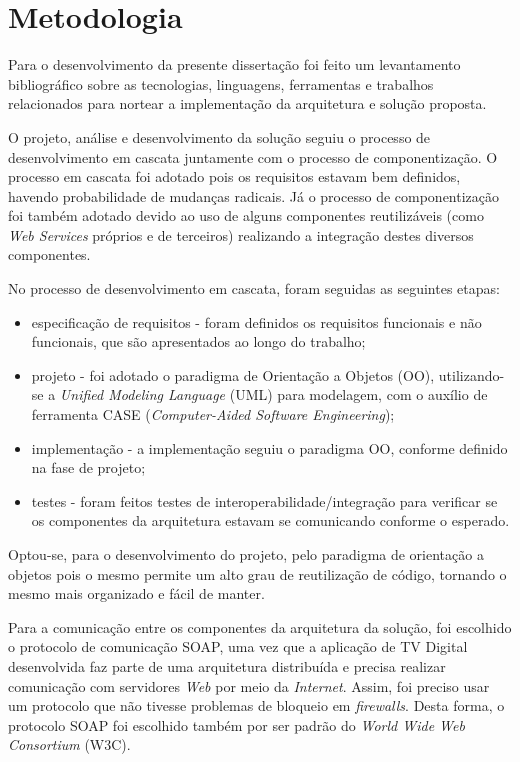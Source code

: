 \section{Metodologia} \label{sec:metodologia}

Para o desenvolvimento da presente dissertação foi feito um levantamento bibliográfico
sobre as tecnologias, linguagens, ferramentas e trabalhos relacionados para nortear
a implementação da arquitetura e solução proposta.

O projeto, análise e desenvolvimento da solução seguiu o
processo de desenvolvimento em cascata juntamente com o processo de componentização\cite{sommerville2011soft}.
O processo em cascata foi adotado pois os requisitos estavam bem definidos, havendo  probabilidade de mudanças radicais.
Já o processo de componentização foi também adotado devido ao uso de alguns componentes reutilizáveis
(como \textit{Web Services} próprios e de terceiros) realizando a integração destes diversos
componentes.

No processo de desenvolvimento em cascata, foram seguidas as seguintes etapas:
\begin{itemize}
	\item especificação de requisitos - foram definidos os requisitos funcionais e não funcionais, que são apresentados ao longo do trabalho;
	\item projeto - foi adotado o paradigma de Orientação a Objetos (OO), utilizando-se a \textit{Unified Modeling Language} (UML) para modelagem, com o auxílio de ferramenta CASE (\textit{Computer-Aided Software Engineering});
	\item implementação - a implementação seguiu o paradigma OO, conforme definido na fase de projeto;
	\item testes - foram feitos testes de interoperabilidade/integração para verificar se os componentes
	da arquitetura estavam se comunicando conforme o esperado.
\end{itemize}


Optou-se, para o desenvolvimento do projeto, pelo paradigma de orientação a objetos pois o mesmo 
permite um alto grau de reutilização de código, tornando o mesmo mais organizado
e fácil de manter.

Para a comunicação entre os componentes da arquitetura da solução, foi escolhido o protocolo de comunicação SOAP, uma vez que a aplicação de TV Digital desenvolvida
faz parte de uma arquitetura distribuída e precisa realizar comunicação 
com servidores \textit{Web} por meio da \textit{Internet}. Assim, foi preciso usar um protocolo
que não tivesse problemas de bloqueio em \textit{firewalls}. Desta forma, o protocolo SOAP foi escolhido
também por ser padrão do \textit{World Wide Web Consortium} (W3C).

